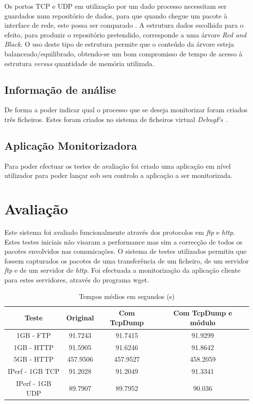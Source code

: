 \documentclass[a4paper]{llncs}
\newcommand{\td}[1]{\todo[inline]{#1}}
\begin{document}
Os portos TCP e UDP em utilização por um dado processo necessitam ser guardados num repositório de dados, para que quando chegue um pacote à interface de rede, este possa ser comparado \td{explicação um pouco mais detalhada}. A estrutura dados escolhida para o efeito, para produzir o repositório pretendido, corresponde a uma árvore \textit{Red and Black}. O uso deste tipo de estrutura permite que o conteúdo da árvore esteja balanceado/equilibrado, obtendo-se um bom compromisso de tempo de acesso à estrutura \textit{versus} quantidade de memória utilizada.

\subsection*{Informação de análise}
\label{sub:data_information}

De forma a poder indicar qual o processo que se deseja monitorizar foram criados três ficheiros. Estes foram criados no sistema de ficheiros virtual \textit{DebugFs}~\cite{DebugFs}.

\subsection{Aplicação Monitorizadora}
\label{sub:monitor_app}
Para poder efectuar os testes de avaliação foi criado uma aplicação em nível utilizador para poder lançar sob seu controlo a aplicação a ser monitorizada.

\section{Avaliação}
\label{sec:evaluation}
Este sistema foi avaliado funcionalmente através dos protocolos em \textit{ftp} e \textit{http}. Estes testes iniciais não visaram a performance mas sim a correcção de todos os pacotes envolvidos nas comunicações.
O sistema de testes utilizados permitiu que fossem capturados os pacotes de uma transferência de um ficheiro, de um servidor \textit{ftp} e de um servidor de \textit{http}. Foi efectuada a monitorização da aplicação cliente para estes servidores, através do programa wget.

\begin{table}
\begin{center}
\caption{Tempos médios em segundos (s)}
\begin{tabular}{ | c | c | c | c |  }
\hline
Teste & \hspace {0.3cm} Original \hspace {0.3cm}& \hspace {0.2cm} Com TcpDump \hspace {0.2cm} & Com TcpDump e módulo \\
\hline
1GB - FTP & 91.7243	& 91.7415 & 91.9299 \\
1GB - HTTP & 91.5905 & 91.6246 & 91.8642 \\
5GB - HTTP & 457.9506 & 457.9527 & 458.2059 \\
IPerf - 1GB TCP & 91.2028	& 91.2049	& 91.3341 \\
IPerf - 1GB UDP & 89.7907 & 89.7952 & 90.036 \\
\hline
\end{tabular}
\end{center}
\end{table}
\end{document}
